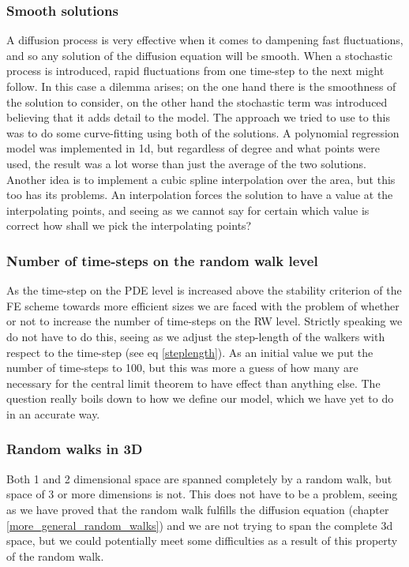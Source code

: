 \subsubsection{Smooth solutions}
 A diffusion process is very effective when it comes to dampening fast fluctuations, and so any solution of the diffusion equation will be smooth. 
 When a stochastic process is introduced, rapid fluctuations from one time-step to the next might follow.
 In this case a dilemma arises; on the one hand there is the smoothness of the solution to consider, on the other hand the stochastic term was introduced believing that it adds detail to the model. 
 The approach we tried to use to this was to do some curve-fitting using both of the solutions. 
 A polynomial regression model was implemented in 1d, but regardless of degree and what points were used, the result was a lot worse than just the average of the two solutions. 
 Another idea is to implement a cubic spline interpolation over the area, but this too has its problems. An interpolation forces the solution to have a value at the interpolating points, and seeing as we cannot say for certain which value is correct how shall we pick the interpolating points?

\subsubsection{Number of time-steps on the random walk level}
 As the time-step on the PDE level is increased above the stability criterion of the FE scheme towards more efficient sizes we are faced with the problem of whether or not to increase the number of time-steps on the RW level. 
 Strictly speaking we do not have to do this, seeing as we adjust the step-length of the walkers with respect to the time-step (see eq \ref{steplength}). 
 As an initial value we put the number of time-steps to 100, but this was more a guess of how many are necessary for the central limit theorem to have effect than anything else. 
 The question really boils down to how we define our model, which we have yet to do in an accurate way.

\subsubsection{Random walks in 3D}
 Both 1 and 2 dimensional space are spanned completely by a random walk, but space of 3 or more dimensions is not. 
 This does not have to be a problem, seeing as we have proved that the random walk fulfills the diffusion equation (chapter \ref{more_general_random_walks}) and we are not trying to span the complete 3d space, but we could potentially meet some difficulties as a result of this property of the random walk.

